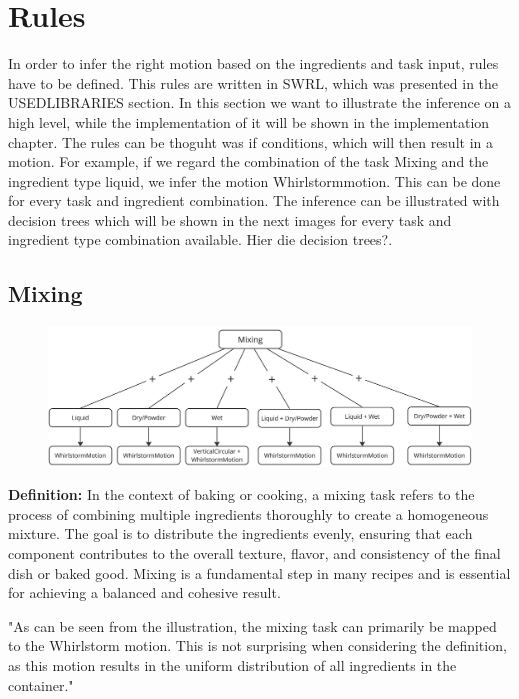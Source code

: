\section{Rules}
In order to infer the right motion based on the ingredients and task input, rules have to be defined. This rules are written in SWRL, which was presented in the USEDLIBRARIES section. In this section we want to illustrate the inference on a high level, while the implementation of it will be shown in the implementation chapter. 
The rules can be thoguht was if conditions, which will then result in a motion. For example, if we regard the combination of the task Mixing and the ingredient type liquid, we infer the motion Whirlstormmotion. This can be done for every task and ingredient combination. 
The inference can be illustrated with decision trees which will be shown in the next images for every task and ingredient type combination available. 
Hier die decision trees?.

\subsection{Mixing}
\begin{figure}[H]
\includegraphics[scale=0.18]{Graphics/MixingDecisionTree.jpg}
\end{figure}
\textbf{Definition:} In the context of baking or cooking, a mixing task refers to the process of combining multiple ingredients thoroughly to create a homogeneous mixture. The goal is to distribute the ingredients evenly, ensuring that each component contributes to the overall texture, flavor, and consistency of the final dish or baked good. Mixing is a fundamental step in many recipes and is essential for achieving a balanced and cohesive result.


"As can be seen from the illustration, the mixing task can primarily be mapped to the Whirlstorm motion. This is not surprising when considering the definition, as this motion results in the uniform distribution of all ingredients in the container."
